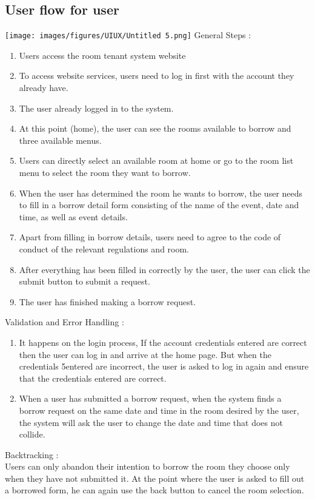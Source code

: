 \documentclass[12pt,titlepage,a4paper]{report}
\begin{document}
    \subsection{User flow for user}
    \noindent
    \texttt{[image: images/figures/UIUX/Untitled 5.png]}
    General Steps :
    \begin{enumerate}
        \item Users access the room tenant system website
        \item To access website services, users need to log in first with the account they already have.
        \item The user already logged in to the system.
        \item At this point (home), the user can see the rooms available to borrow and three available menus.
        \item Users can directly select an available room at home or go to the room list menu to select the room they want to borrow.
        \item When the user has determined the room he wants to borrow, the user needs to fill in a borrow detail form consisting of the name of the event, date and time, as well as event details.
        \item Apart from filling in borrow details, users need to agree to the code of conduct of the relevant regulations and room.
        \item After everything has been filled in correctly by the user, the user can click the submit button to submit a request.
        \item The user has finished making a borrow request.
    \end{enumerate}
    Validation and Error Handling :
    \begin{enumerate}
        \item It happens on the login process, If the account credentials entered are correct then the user can log in and arrive at the home page. But when the credentials 5entered are incorrect, the user is asked to log in again and ensure that the credentials entered are correct.
        \item When a user has submitted a borrow request, when the system finds a borrow request on the same date and time in the room desired by the user, the system will ask the user to change the date and time that does not collide.
    \end{enumerate}
    Backtracking :\\
    Users can only abandon their intention to borrow the room they choose only when they have not submitted it. At the point where the user is asked to fill out a borrowed form, he can again use the back button to cancel the room selection.
\end{document}
